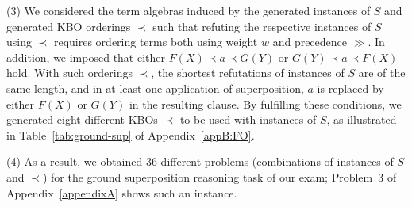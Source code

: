 
\noindent(3) We considered the term algebras induced by the generated
instances of $S$ and  generated KBO orderings $\prec$ such that
refuting the respective instances of $S$ using $\prec$ requires
ordering terms both using weight $w$ and precedence $\gg$. %
In addition, we imposed that  either $F(X) \prec a \prec G(Y)$ 
or $G(Y) \prec a \prec F(X)$ hold. With such orderings $\prec$,
the shortest refutations of instances of $S$ are of the same length, and in
at least one application of superposition, $a$ is replaced by either $F(X)$ or $G(Y)$
in the resulting clause. %
By fulfilling these conditions, we generated eight
different KBOs $\prec$ to be used with instances of $S$, as
illustrated in Table~\ref{tab:ground-sup} of Appendix~\ref{appB:FO}. \smallskip

\noindent(4) As a result, we obtained 36 different problems (combinations of
instances of $S$ and $\prec$) for  the ground
superposition reasoning task of our exam; Problem~3 of
Appendix~\ref{appendixA} shows such an instance.

